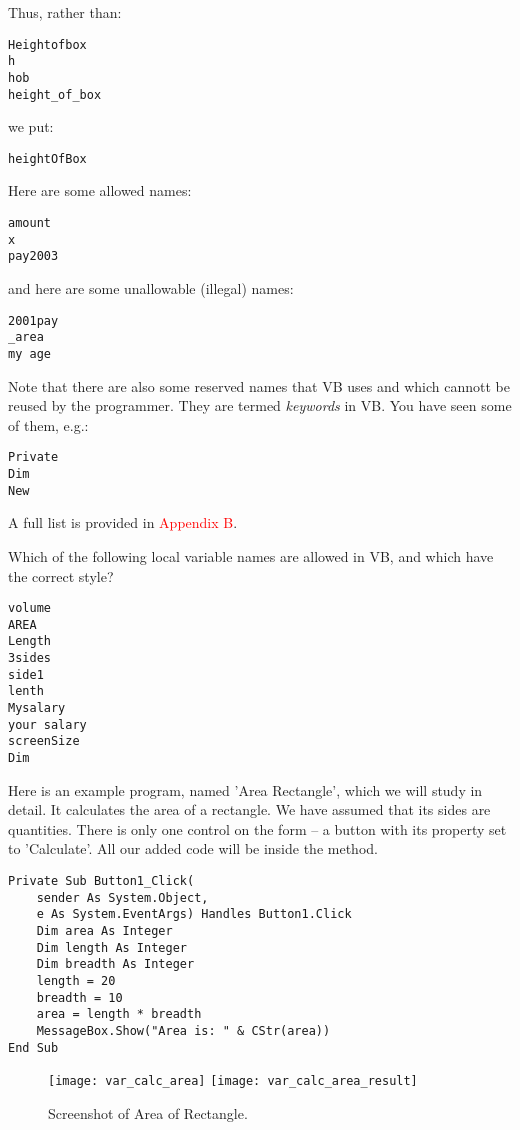 		Thus, rather than:
		\begin{lstlisting}
Heightofbox
h
hob
height_of_box
		\end{lstlisting}
		we put:
		\begin{lstlisting}
heightOfBox
		\end{lstlisting}
		Here are some allowed names:
		\begin{lstlisting}
amount
x
pay2003
		\end{lstlisting}
		and here are some unallowable (illegal) names:
		\begin{lstlisting}
2001pay
_area
my age
		\end{lstlisting}
		Note that there are also some reserved names that VB uses and which cannott be reused by the programmer. They are termed \emph{keywords} in VB. You have seen some of them, e.g.:
		\begin{lstlisting}
Private
Dim
New
		\end{lstlisting}
A full list is provided in \textcolor{red}{Appendix B}.

		\begin{stqb}
			\begin{STQ}
			\item	Which of the following local variable names are allowed in VB, and which have the correct style?
				\begin{lstlisting}
volume
AREA
Length
3sides
side1	
lenth	
Mysalary
your salary
screenSize
Dim
				\end{lstlisting}
			\end{STQ}
		\end{stqb}

		Here is an example program, named 'Area Rectangle', which we will study in detail. It calculates the area of a rectangle. We have assumed that its sides are  quantities. There is only one control on the form – a button with its  property set to 'Calculate'. All our added code will be inside the  method.
		\begin{lstlisting}
Private Sub Button1_Click( 
	sender As System.Object, 
	e As System.EventArgs) Handles Button1.Click
	Dim area As Integer
	Dim length As Integer
	Dim breadth As Integer
	length = 20
	breadth = 10
	area = length * breadth
	MessageBox.Show("Area is: " & CStr(area))
End Sub
		\end{lstlisting}
		\begin{figure}[ht]
			\centering
			\texttt{[image: var\_calc\_area]}
			\texttt{[image: var\_calc\_area\_result]}
			\caption{Screenshot of Area of Rectangle.}
			\label{fig:var_calc_area}
		\end{figure}

